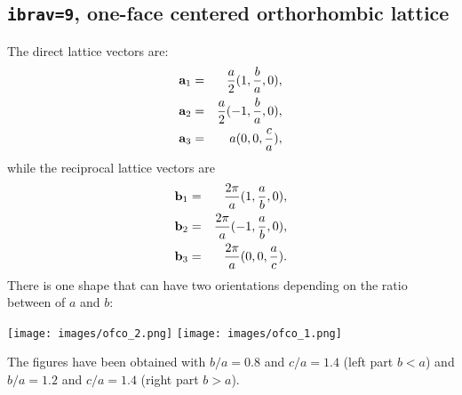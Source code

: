\documentclass[12pt,a4paper]{article}
\begin{document}
\subsection{\texttt{ibrav=9}, one-face centered orthorhombic lattice}
The direct lattice vectors are:
\begin{eqnarray}
{\bf a}_1 &=& {a \over 2} (1, {b \over a}, 0), \nonumber \\
{\bf a}_2 &=& {a \over 2} (-1, {b \over a}, 0), \nonumber \\
{\bf a}_3 &=& a  (0, 0, {c \over a}), \nonumber
\nonumber
\end{eqnarray}
while the reciprocal lattice vectors are
\begin{eqnarray}
{\bf b}_1 &=& {2\pi \over a} (1, {a \over b}, 0), \nonumber \\
{\bf b}_2 &=& {2\pi \over a} (-1, {a \over b}, 0), \nonumber \\
{\bf b}_3 &=& {2\pi \over a} (0, 0, {a \over c}). \nonumber
\nonumber
\end{eqnarray}
There is one shape that can have two orientations depending on the
ratio between of $a$ and $b$:
\begin{center}
\texttt{[image: images/ofco\_2.png]} \hspace{1cm}
\texttt{[image: images/ofco\_1.png]}
\end{center}
The figures have been obtained with $b/a=0.8$ and $c/a=1.4$ (left part $b<a$) 
and $b/a=1.2$ and $c/a=1.4$ (right part $b>a$).
\end{document}

